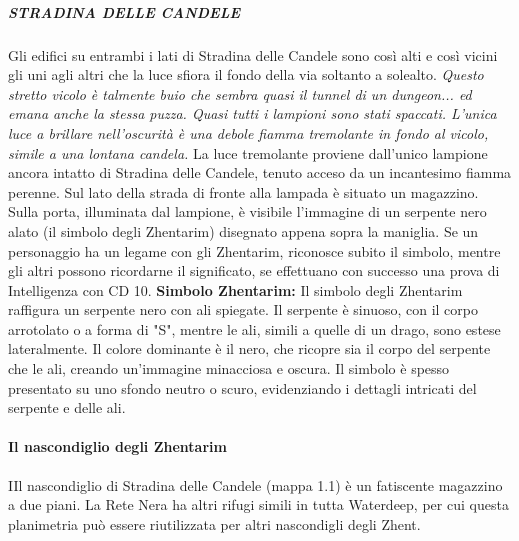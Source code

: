 \documentclass{article}
\begin{document}
                        \subparagraph{STRADINA DELLE CANDELE}
Gli edifici su entrambi i lati di Stradina delle Candele sono così alti e così vicini gli uni agli altri che la luce sfiora il fondo della via soltanto a solealto.\newline
\textit{Questo stretto vicolo è talmente buio che sembra quasi il tunnel di un dungeon... ed emana anche la stessa puzza. 
Quasi tutti i lampioni sono stati spaccati. L'unica luce a brillare nell'oscurità è una debole fiamma tremolante in fondo al vicolo, simile a una lontana candela.}
\newline
La luce tremolante proviene dall'unico lampione ancora intatto di Stradina delle Candele, tenuto acceso da un incantesimo fiamma perenne. Sul lato della strada di fronte alla lampada è situato un magazzino. Sulla porta, illuminata dal lampione, è visibile l'immagine di un serpente nero alato (il simbolo degli Zhentarim) disegnato appena sopra la maniglia. Se un personaggio ha un legame con gli Zhentarim, riconosce subito il simbolo, mentre gli altri possono ricordarne il significato, se effettuano con successo una prova di Intelligenza con CD 10. 
\textbf{Simbolo Zhentarim: }Il simbolo degli Zhentarim raffigura un serpente nero con ali spiegate. Il serpente è sinuoso, con il corpo arrotolato o a forma di "S", mentre le ali, simili a quelle di un drago, sono estese lateralmente. Il colore dominante è il nero, che ricopre sia il corpo del serpente che le ali, creando un'immagine minacciosa e oscura. Il simbolo è spesso presentato su uno sfondo neutro o scuro, evidenziando i dettagli intricati del serpente e delle ali.
                \paragraph{Il nascondiglio degli Zhentarim}
IIl nascondiglio di Stradina delle Candele (mappa 1.1) è un fatiscente magazzino a due piani. La Rete Nera ha altri rifugi simili in tutta Waterdeep, per cui questa planimetria può essere riutilizzata per altri nascondigli degli Zhent.
\end{document}
